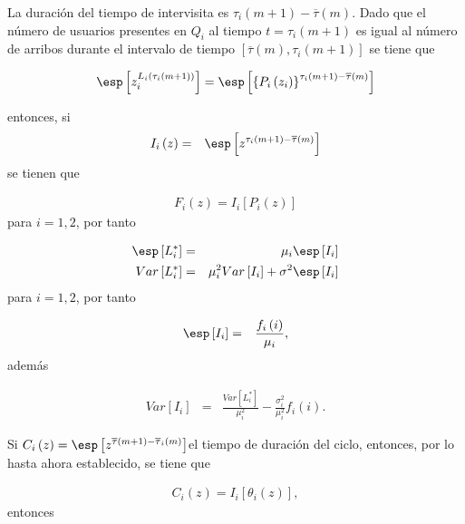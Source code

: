 La duraci\'on del tiempo de intervisita es $\tau_{i}\left(m+1\right)-\overline{\tau}\left(m\right)$. Dado que el n\'umero de usuarios presentes en $Q_{i}$ al tiempo $t=\tau_{i}\left(m+1\right)$ es igual al n\'umero de arribos durante el intervalo de tiempo $\left[\overline{\tau}\left(m\right),\tau_{i}\left(m+1\right)\right]$ se tiene que


\begin{eqnarray*}
\esp\left[z_{i}^{L_{i}\left(\tau_{i}\left(m+1\right)\right)}\right]=\esp\left[\left\{P_{i}\left(z_{i}\right)\right\}^{\tau_{i}\left(m+1\right)-\overline{\tau}\left(m\right)}\right]
\end{eqnarray*}

entonces, si \begin{eqnarray*}I_{i}\left(z\right)&=&\esp\left[z^{\tau_{i}\left(m+1\right)-\overline{\tau}\left(m\right)}\right]\end{eqnarray*} se tienen que

\begin{eqnarray*}
F_{i}\left(z\right)=I_{i}\left[P_{i}\left(z\right)\right]
\end{eqnarray*}
para $i=1,2$, por tanto



\begin{eqnarray*}
\esp\left[L_{i}^{*}\right]&=&\mu_{i}\esp\left[I_{i}\right]\\
Var\left[L_{i}^{*}\right]&=&\mu_{i}^{2}Var\left[I_{i}\right]+\sigma^{2}\esp\left[I_{i}\right]
\end{eqnarray*}
para $i=1,2$, por tanto


\begin{eqnarray*}
\esp\left[I_{i}\right]&=&\frac{f_{i}\left(i\right)}{\mu_{i}},
\end{eqnarray*}
adem\'as

\begin{eqnarray*}
Var\left[I_{i}\right]&=&\frac{Var\left[L_{i}^{*}\right]}{\mu_{i}^{2}}-\frac{\sigma_{i}^{2}}{\mu_{i}^{2}}f_{i}\left(i\right).
\end{eqnarray*}


Si  $C_{i}\left(z\right)=\esp\left[z^{\overline{\tau}\left(m+1\right)-\overline{\tau}_{i}\left(m\right)}\right]$el tiempo de duraci\'on del ciclo, entonces, por lo hasta ahora establecido, se tiene que

\begin{eqnarray*}
C_{i}\left(z\right)=I_{i}\left[\theta_{i}\left(z\right)\right],
\end{eqnarray*}
entonces

